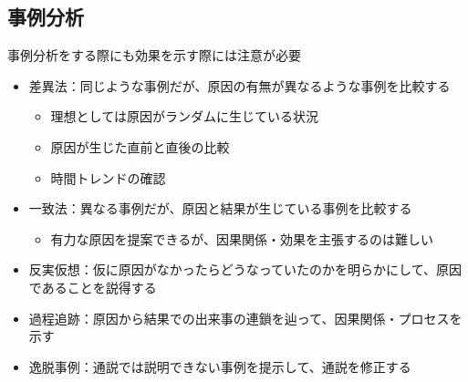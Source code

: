 \documentclass[
  xelatex,
  ja=standard]{bxjsarticle}
\providecommand{\tightlist}{%
  \setlength{\itemsep}{0pt}\setlength{\parskip}{0pt}}\usepackage{longtable,booktabs,array}
\begin{document}
\hypertarget{ux4e8bux4f8bux5206ux6790}{%
\subsection{事例分析}\label{ux4e8bux4f8bux5206ux6790}}

事例分析をする際にも効果を示す際には注意が必要\citep{kume2013, ito2022}

\begin{itemize}
\tightlist
\item
  差異法：同じような事例だが、原因の有無が異なるような事例を比較する

  \begin{itemize}
  \tightlist
  \item
    理想としては原因がランダムに生じている状況
  \item
    原因が生じた直前と直後の比較
  \item
    時間トレンドの確認
  \end{itemize}
\item
  一致法：異なる事例だが、原因と結果が生じている事例を比較する

  \begin{itemize}
  \tightlist
  \item
    有力な原因を提案できるが、因果関係・効果を主張するのは難しい
  \end{itemize}
\item
  反実仮想：仮に原因がなかったらどうなっていたのかを明らかにして、原因であることを説得する
\item
  過程追跡：原因から結果での出来事の連鎖を辿って、因果関係・プロセスを示す
\item
  逸脱事例：通説では説明できない事例を提示して、通説を修正する
\end{itemize}


  
\end{document}
